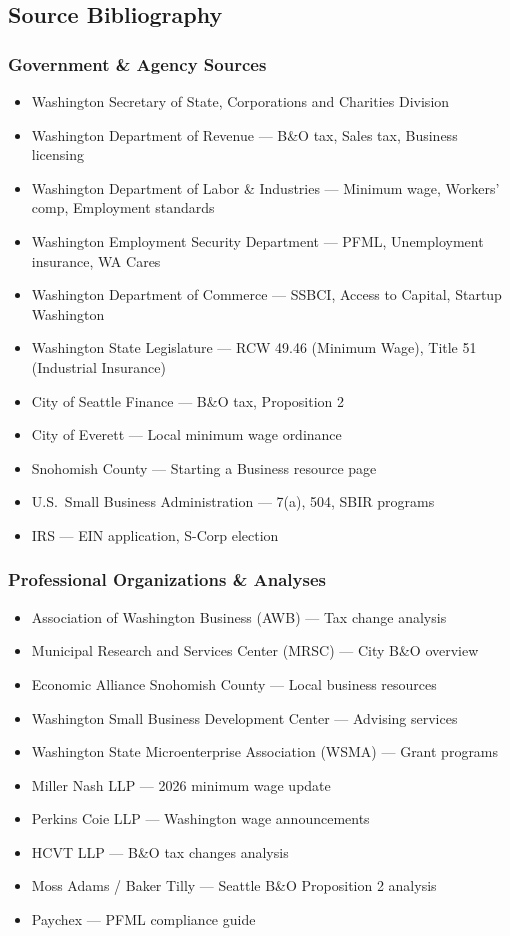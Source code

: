 \documentclass[11pt,letterpaper]{article}
\begin{document}
\subsection{Source Bibliography}

\subsubsection*{Government \& Agency Sources}
\begin{itemize}[leftmargin=2em]
  \item Washington Secretary of State, Corporations and Charities Division
  \item Washington Department of Revenue --- B\&O tax, Sales tax, Business licensing
  \item Washington Department of Labor \& Industries --- Minimum wage, Workers' comp, Employment standards
  \item Washington Employment Security Department --- PFML, Unemployment insurance, WA Cares
  \item Washington Department of Commerce --- SSBCI, Access to Capital, Startup Washington
  \item Washington State Legislature --- RCW 49.46 (Minimum Wage), Title 51 (Industrial Insurance)
  \item City of Seattle Finance --- B\&O tax, Proposition 2
  \item City of Everett --- Local minimum wage ordinance
  \item Snohomish County --- Starting a Business resource page
  \item U.S.\ Small Business Administration --- 7(a), 504, SBIR programs
  \item IRS --- EIN application, S-Corp election
\end{itemize}

\subsubsection*{Professional Organizations \& Analyses}
\begin{itemize}[leftmargin=2em]
  \item Association of Washington Business (AWB) --- Tax change analysis
  \item Municipal Research and Services Center (MRSC) --- City B\&O overview
  \item Economic Alliance Snohomish County --- Local business resources
  \item Washington Small Business Development Center --- Advising services
  \item Washington State Microenterprise Association (WSMA) --- Grant programs
  \item Miller Nash LLP --- 2026 minimum wage update
  \item Perkins Coie LLP --- Washington wage announcements
  \item HCVT LLP --- B\&O tax changes analysis
  \item Moss Adams / Baker Tilly --- Seattle B\&O Proposition 2 analysis
  \item Paychex --- PFML compliance guide
\end{itemize}
\end{document}
